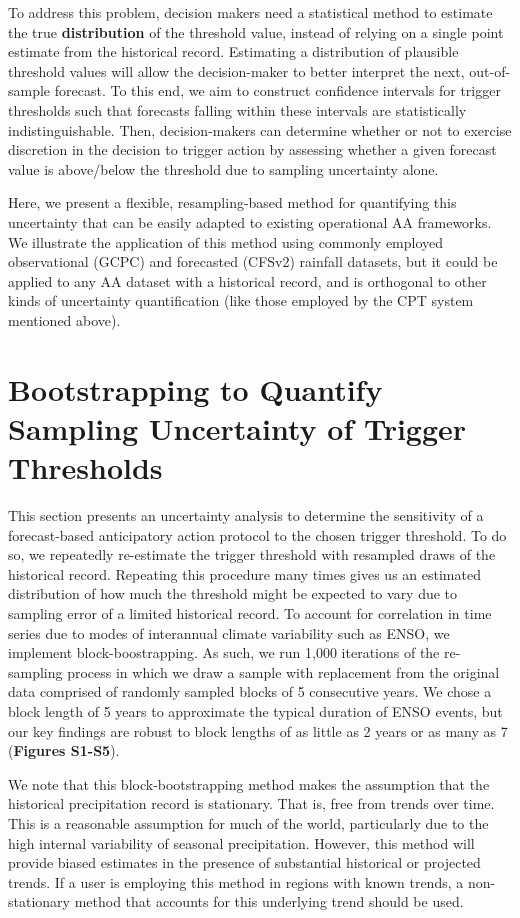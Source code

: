 \documentclass{ametsocV6.1}
\begin{document}
To address this problem, decision makers need a statistical method to estimate the true \textbf{distribution} of the threshold value, instead of relying on a single point estimate from the historical record. Estimating a distribution of plausible threshold values will allow the decision-maker to better interpret the next, out-of-sample forecast. To this end, we aim to construct confidence intervals for trigger thresholds such that forecasts falling within these intervals are statistically indistinguishable. Then, decision-makers can determine whether or not to exercise discretion in the decision to trigger action by assessing whether a given forecast value is above/below the threshold due to sampling uncertainty alone. 

Here, we present a flexible, resampling-based method for quantifying this uncertainty that can be easily adapted to existing operational AA frameworks. We illustrate the application of this method using commonly employed observational (GCPC) and forecasted (CFSv2) rainfall datasets, but it could be applied to any AA dataset with a historical record, and is orthogonal to other kinds of uncertainty quantification (like those employed by the CPT system mentioned above). 

\section{Bootstrapping to Quantify Sampling Uncertainty of Trigger Thresholds}

This section presents an uncertainty analysis to determine the sensitivity of a forecast-based anticipatory action protocol to the chosen trigger threshold. To do so, we repeatedly re-estimate the trigger threshold with resampled draws of the historical record. Repeating this procedure many times gives us an estimated distribution of how much the threshold might be expected to vary due to sampling error of a limited historical record. To account for correlation in time series due to modes of interannual climate variability such as ENSO, we implement block-boostrapping. As such, we run 1,000 iterations of the re-sampling process in which we draw a sample with replacement from the original data comprised of randomly sampled blocks of 5 consecutive years. We chose a block length of 5 years to approximate the typical duration of ENSO events, but our key findings are robust to block lengths of as little as 2 years or as many as 7 (\textbf{Figures S1-S5}). 

We note that this block-bootstrapping method makes the assumption that the historical precipitation record is stationary. That is, free from trends over time. This is a reasonable assumption for much of the world, particularly due to the high internal variability of seasonal precipitation. However, this method will provide biased estimates in the presence of substantial historical or projected trends. If a user is employing this method in regions with known trends, a non-stationary method that accounts for this underlying trend should be used.
\end{document}
